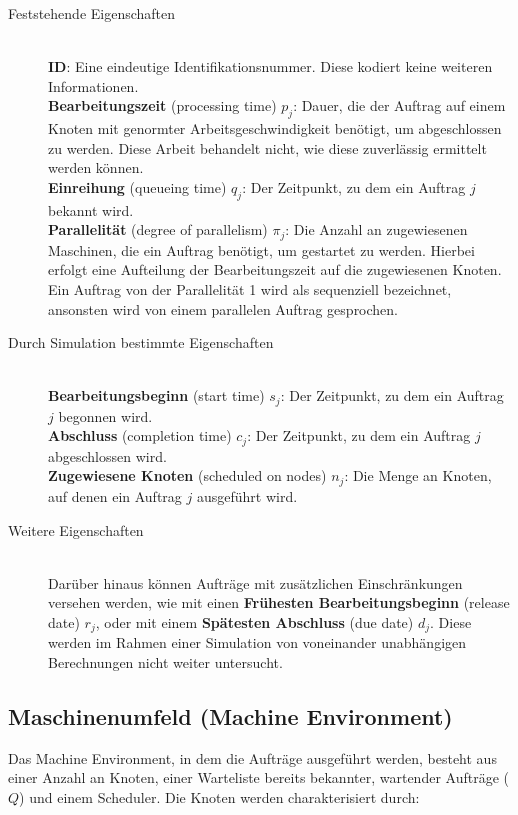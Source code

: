 \begin{description}
\item[Feststehende Eigenschaften] \hfil \\
\textbf{ID}: Eine eindeutige Identifikationsnummer. Diese kodiert keine weiteren Informationen.\\
\textbf{Bearbeitungszeit} (processing time) $p_j$: Dauer, die der Auftrag auf einem Knoten mit genormter Arbeitsgeschwindigkeit benötigt, um abgeschlossen zu werden. Diese Arbeit behandelt nicht, wie diese zuverlässig ermittelt werden können. \\
\textbf{Einreihung} (queueing time) $q_j$: Der Zeitpunkt, zu dem ein Auftrag $j$ bekannt wird.\\
\textbf{Parallelität} (degree of parallelism) $\pi_j$: Die Anzahl an zugewiesenen Maschinen, die ein Auftrag benötigt, um gestartet zu werden. Hierbei erfolgt eine Aufteilung der Bearbeitungszeit auf die zugewiesenen Knoten. Ein Auftrag von der Parallelität 1 wird als sequenziell bezeichnet, ansonsten wird von einem parallelen Auftrag gesprochen.\\
\item[Durch Simulation bestimmte Eigenschaften]\hfill \\ 
\textbf{Bearbeitungsbeginn} (start time) $s_j$: Der Zeitpunkt, zu dem ein Auftrag $j$ begonnen wird. \\
\textbf{Abschluss} (completion time) $c_j$: Der Zeitpunkt, zu dem ein Auftrag $j$ abgeschlossen wird.\\
\textbf{Zugewiesene Knoten} (scheduled on nodes) $n_j$: Die Menge an Knoten, auf denen ein Auftrag $j$ ausgeführt wird.\\

\item[Weitere Eigenschaften] \hfil \\
Darüber hinaus können Aufträge mit zusätzlichen Einschränkungen versehen werden, wie mit einen \textbf{Frühesten Bearbeitungsbeginn} (release date) $r_j$, oder mit einem \textbf{Spätesten Abschluss} (due date) $d_j$. Diese werden im Rahmen einer Simulation von voneinander unabhängigen Berechnungen nicht weiter untersucht.
\end{description}

\subsection{Maschinenumfeld (Machine Environment)}
Das Machine Environment, in dem die Aufträge ausgeführt werden, besteht aus einer Anzahl an Knoten, einer Warteliste bereits bekannter, wartender Aufträge ($Q$) und einem Scheduler. Die Knoten werden charakterisiert durch:

